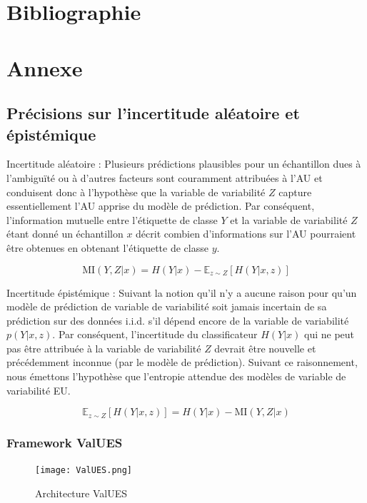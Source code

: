 \documentclass[a4paper,french,bookmarks,12pt]{article}
\begin{document}
\section{Bibliographie}
\printbibliography[heading=none]

\clearpage

\section{Annexe}
\subsection{Précisions sur l'incertitude aléatoire et épistémique}

Incertitude aléatoire : Plusieurs prédictions plausibles pour un échantillon dues à l'ambiguïté ou à d'autres facteurs sont couramment attribuées à l'AU et conduisent donc à l'hypothèse que la variable de variabilité \( Z \) capture essentiellement l'AU apprise du modèle de prédiction. Par conséquent, l'information mutuelle entre l'étiquette de classe \( Y \) et la variable de variabilité \( Z \) étant donné un échantillon \( x \) décrit combien d'informations sur l'AU pourraient être obtenues en obtenant l'étiquette de classe \( y \).

$$
\text{MI}(Y, Z|x) = H(Y|x) - \mathbb{E}_{z \sim Z}[H(Y|x, z)]
$$

Incertitude épistémique : Suivant la notion qu'il n'y a aucune raison pour qu'un modèle de prédiction de variable de variabilité soit jamais incertain de sa prédiction sur des données i.i.d. s'il dépend encore de la variable de variabilité \( p(Y|x, z) \). Par conséquent, l'incertitude du classificateur \( H(Y|x) \) qui ne peut pas être attribuée à la variable de variabilité \( Z \) devrait être nouvelle et précédemment inconnue (par le modèle de prédiction). Suivant ce raisonnement, nous émettons l'hypothèse que l'entropie attendue des modèles de variable de variabilité EU.

$$
\mathbb{E}_{z \sim Z}[H(Y|x, z)] = H(Y|x) - \text{MI}(Y, Z|x)
$$


\subsubsection{Framework ValUES}


\begin{figure}[h!]
    \centering
    \texttt{[image: ValUES.png]}
    \caption{Architecture ValUES}
    \label{fig:ValUES}
\end{figure}
\end{document}
